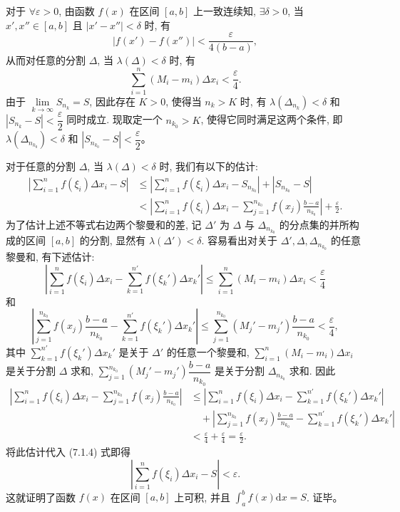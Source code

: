 \documentclass[UTF8,12pt,a4paper,fontset=fandol]{ctexart}
\begin{document}
对于 $\forall\varepsilon>0$, 由函数 $f(x)$ 在区间 $[a,b]$ 上一致连续知, $\exists\delta>0$, 当 $x',x''\in[a,b]$ 且 $|x'-x''|<\delta$ 时, 有
\[
  |f(x')-f(x'')|<\frac{\varepsilon}{4(b-a)},
\]
从而对任意的分割 $\Delta$, 当 $\lambda(\Delta)<\delta$ 时, 有
\[
  \sum_{i=1}^n (M_i-m_i)\Delta x_i<\frac{\varepsilon}{4}.
\]
由于 $\lim\limits_{k\to\infty}S_{n_k}=S$, 因此存在 $K>0$, 使得当 $n_k>K$ 时, 有 $\lambda(\Delta_{n_k})<\delta$ 和 $|S_{n_k}-S|<\dfrac{\varepsilon}{2}$ 同时成立. 现取定一个 $n_{k_0}>K$, 使得它同时满足这两个条件, 即 $\lambda(\Delta_{n_{k_0}})<\delta$ 和 $|S_{n_{k_0}}-S|<\dfrac{\varepsilon}{2}$。

对于任意的分割 $\Delta$, 当 $\lambda(\Delta)<\delta$ 时, 我们有以下的估计:
\begin{equation}
\begin{aligned}
  \left|\sum_{i=1}^n f(\xi_i)\Delta x_i-S\right|
  &\leq \left|\sum_{i=1}^n f(\xi_i)\Delta x_i-S_{n_{k_0}}\right|+|S_{n_{k_0}}-S|\\
  &< \left|\sum_{i=1}^n f(\xi_i)\Delta x_i-\sum_{j=1}^{n_{k_0}} f(x_j)\frac{b-a}{n_{k_0}}\right|+\frac{\varepsilon}{2}.
\end{aligned}
\tag{7.1.4}
\end{equation}
为了估计上述不等式右边两个黎曼和的差, 记 $\Delta'$ 为 $\Delta$ 与 $\Delta_{n_{k_0}}$ 的分点集的并所构成的区间 $[a,b]$ 的分割, 显然有 $\lambda(\Delta')<\delta$. 容易看出对关于 $\Delta',\Delta,\Delta_{n_{k_0}}$ 的任意黎曼和, 有下述估计:
\[
  \left|\sum_{i=1}^n f(\xi_i)\Delta x_i-\sum_{k=1}^{n'}f(\xi_k')\Delta x_k'\right|
  \leq \sum_{i=1}^n(M_i-m_i)\Delta x_i<\frac{\varepsilon}{4}
\]
和
\[
  \left|\sum_{j=1}^{n_{k_0}}f(x_j)\frac{b-a}{n_{k_0}}-\sum_{k=1}^{n'}f(\xi_k')\Delta x_k'\right|
  \leq \sum_{j=1}^{n_{k_0}}(M_j'-m_j')\frac{b-a}{n_{k_0}}<\frac{\varepsilon}{4},
\]
其中 $\sum\limits_{k=1}^{n'}f(\xi_k')\Delta x_k'$ 是关于 $\Delta'$ 的任意一个黎曼和, $\sum\limits_{i=1}^n(M_i-m_i)\Delta x_i$ 是关于分割 $\Delta$ 求和, $\sum\limits_{j=1}^{n_{k_0}}(M_j'-m_j')\dfrac{b-a}{n_{k_0}}$ 是关于分割 $\Delta_{n_{k_0}}$ 求和. 因此
\[
\begin{aligned}
  \left|\sum_{i=1}^n f(\xi_i)\Delta x_i-\sum_{j=1}^{n_{k_0}}f(x_j)\frac{b-a}{n_{k_0}}\right|
  &\leq \left|\sum_{i=1}^n f(\xi_i)\Delta x_i-\sum_{k=1}^{n'}f(\xi_k')\Delta x_k'\right|\\
  &\quad+\left|\sum_{j=1}^{n_{k_0}}f(x_j)\frac{b-a}{n_{k_0}}-\sum_{k=1}^{n'}f(\xi_k')\Delta x_k'\right|\\
  &<\frac{\varepsilon}{4}+\frac{\varepsilon}{4}=\frac{\varepsilon}{2}.
\end{aligned}
\]
将此估计代入 (7.1.4) 式即得
\[
  \left|\sum_{i=1}^n f(\xi_i)\Delta x_i-S\right|<\varepsilon.
\]
这就证明了函数 $f(x)$ 在区间 $[a,b]$ 上可积, 并且 $\int_a^b f(x)\mathrm dx=S$. 证毕。
\end{document}
